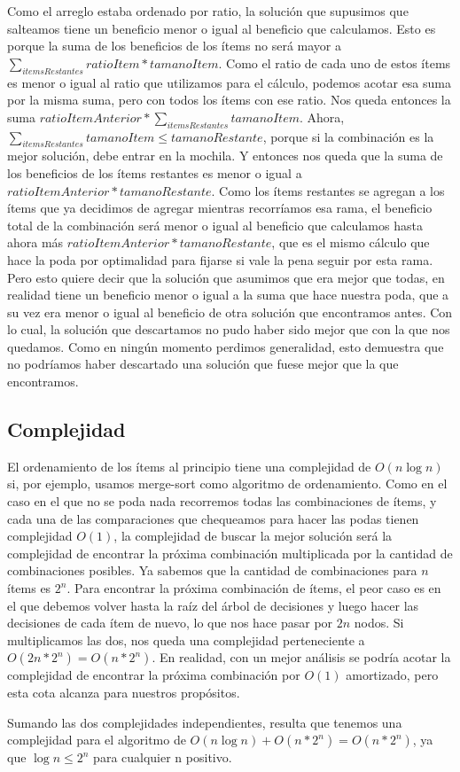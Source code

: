 \documentclass[10pt, a4paper]{article}
\begin{document}
Como el arreglo estaba ordenado por ratio, la solución que supusimos que salteamos tiene un beneficio menor o igual al beneficio que calculamos. Esto es porque la suma de los beneficios de los ítems no será mayor a $\sum_{itemsRestantes} ratioItem * tamanoItem$. Como el ratio de cada uno de estos ítems es menor o igual al ratio que utilizamos para el cálculo, podemos acotar esa suma por la misma suma, pero con todos los ítems con ese ratio. Nos queda entonces la suma $ratioItemAnterior * \sum_{itemsRestantes} tamanoItem$. Ahora, $\sum_{itemsRestantes} tamanoItem \leq tamanoRestante$, porque si la combinación es la mejor solución, debe entrar en la mochila. Y entonces nos queda que la suma de los beneficios de los ítems restantes es menor o igual a $ratioItemAnterior * tamanoRestante$. Como los ítems restantes se agregan a los ítems que ya decidimos de agregar mientras recorríamos esa rama, el beneficio total de la combinación será menor o igual al beneficio que calculamos hasta ahora más $ratioItemAnterior * tamanoRestante$, que es el mismo cálculo que hace la poda por optimalidad para fijarse si vale la pena seguir por esta rama. Pero esto quiere decir que la solución que asumimos que era mejor que todas, en realidad tiene un beneficio menor o igual a la suma que hace nuestra poda, que a su vez era menor o igual al beneficio de otra solución que encontramos antes. Con lo cual, la solución que descartamos no pudo haber sido mejor que con la que nos quedamos. Como en ningún momento perdimos generalidad, esto demuestra que no podríamos haber descartado una solución que fuese mejor que la que encontramos.\par

\subsection{Complejidad}
El ordenamiento de los ítems al principio tiene una complejidad de $O(n \log{} n)$ si, por ejemplo, usamos merge-sort como algoritmo de ordenamiento. Como en el caso en el que no se poda nada recorremos todas las combinaciones de ítems, y cada una de las comparaciones que chequeamos para hacer las podas tienen complejidad $O(1)$, la complejidad de buscar la mejor solución será la complejidad de encontrar la próxima combinación multiplicada por la cantidad de combinaciones posibles. Ya sabemos que la cantidad de combinaciones para $n$ ítems es $2^n$. Para encontrar la próxima combinación de ítems, el peor caso es en el que debemos volver hasta la raíz del árbol de decisiones y luego hacer las decisiones de cada ítem de nuevo, lo que nos hace pasar por $2n$ nodos. Si multiplicamos las dos, nos queda una complejidad perteneciente a $O(2n * 2^n) = O(n * 2^n)$. En realidad, con un mejor análisis se podría acotar la complejidad de encontrar la próxima combinación por $O(1)$ amortizado, pero esta cota alcanza para nuestros propósitos.\par
Sumando las dos complejidades independientes, resulta que tenemos una complejidad para el algoritmo de $O(n \log{} n) + O(n * 2^n) = O(n * 2^n)$, ya que $\log{} n \leq 2^n$ para cualquier n positivo.
\end{document}
